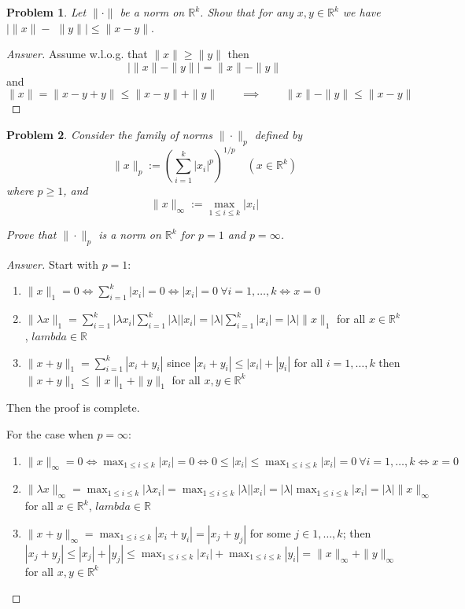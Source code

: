 \documentclass{article}
\newtheorem{problem}{Problem}
\newcommand{\qiq}{\qquad \implies \qquad}
\begin{document}
\begin{problem}
    Let $\|\cdot\|$ be a norm on $\mathbb{R}^{k}$. Show that for any $x, y \in \mathbb{R}^{k}$ we have $\mid\|x\|-$ $\|y\| \mid \leq\|x-y\| .$
\end{problem}
\begin{proof}[Answer]
    Assume w.l.o.g. that $\|x\| \geq \|y\|$ then
    $$\big |\|x\|-\|y\|\big| = \|x\|-\|y\|$$
    and 
    $$\|x\| = \|x-y + y \| \leq \|x-y\| + \|y\| \qiq \|x\| - \|y\| \leq \|x-y\|$$
\end{proof}

\begin{problem}
    Consider the family of norms $\|\cdot\|_{p}$ defined by
$$
\|x\|_{p}:=\left(\sum_{i=1}^{k}\left|x_{i}\right|^{p}\right)^{1 / p} \quad\left(x \in \mathbb{R}^{k}\right)
$$
where $p \geq 1$, and 
$$\|x\|_{\infty}:=\max _{1 \leq i \leq k}\left|x_{i}\right|$$

Prove that $\|\cdot\|_{p}$ is a norm on $\mathbb{R}^{k}$ for $p=1$ and $p=\infty$.
\end{problem}
\begin{proof}[Answer]
    Start with $p=1$:
    \begin{enumerate}
        \item $\|x\|_1=0 \iff \sum_{i=1}^{k}\left|x_{i}\right| = 0 \iff |x_i| = 0 \: \forall i=1,\ldots,k \iff  x = 0$
        \item $\|\lambda x\|_1 = \sum_{i=1}^{k}\left|\lambda x_{i}\right| \sum_{i=1}^{k}|\lambda|\left|x_{i}\right| = |\lambda|\sum_{i=1}^{k}\left|x_{i}\right| = |\lambda| \|x\|_1$ for all $x\in \mathbb{R}^k$, $lambda\in \mathbb{R}$
        \item $\|x + y\|_1 = \sum_{i=1}^{k}\left|x_{i} + y_i\right|$ since $|x_i + y_i|\leq |x_i| + |y_i|$ for all $i=1,\ldots, k$ then $\|x + y\|_1\leq \|x \|_1 + \| y\|_1$ for all $x,y\in \mathbb{R}^k$
    \end{enumerate}
    Then the proof is complete.

    For the case when $p=\infty$:
    \begin{enumerate}
        \item $\|x\|_\infty=0 \iff \max _{1 \leq i \leq k}\left|x_{i}\right| = 0 \iff 0 \leq \left|x_{i}\right| \leq  \max _{1 \leq i \leq k}\left|x_{i}\right|  = 0 \:  \forall i=1,\ldots,k \iff  x = 0$ 
        \item $\|\lambda x\|_\infty = \max _{1 \leq i \leq k}\left|\lambda x_{i}\right| =\max _{1 \leq i \leq k}\left|\lambda| |x_{i}\right| = |\lambda| \max _{1 \leq i \leq k}\left|x_{i}\right| = |\lambda| \|x\|_\infty$ for all $x\in \mathbb{R}^k$, $lambda\in \mathbb{R}$
        \item $\| x + y\|_\infty = \max _{1 \leq i \leq k}\left|x_{i} + y_{i}\right|=\left|x_{j} + y_{j}\right|$ for some $j\in 1,\ldots , k$; then
              $\left|x_{j} + y_{j}\right| \leq |x_j| + |y_j| \leq \max _{1 \leq i \leq k}\left|x_{i}\right| + \max _{1 \leq i \leq k}\left|y_{i}\right| = \|x\|_\infty+\|y\|_\infty$  for all $x,y\in \mathbb{R}^k$
    \end{enumerate}
\end{proof}
\end{document}
